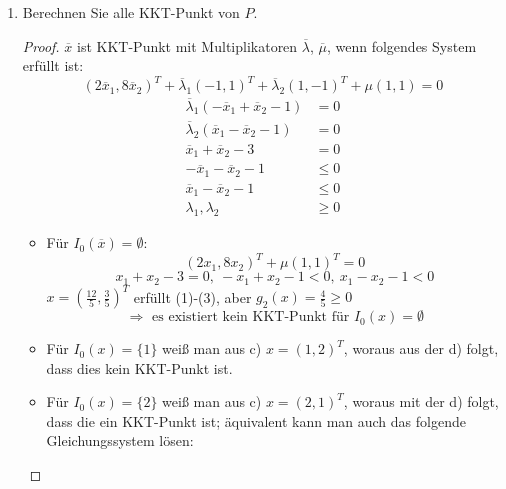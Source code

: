 \documentclass[12pt]{extreport} %
\theoremstyle{named}
\theoremstyle{nnamed}
\theoremstyle{itshape}
\theoremstyle{normal}
\begin{document}
\begin{enumerate}
\begin{proof}
\begin{figure*}[h!]
		\end{figure*}
		$$ \textit{ Zeichnung im Block } $$
		Es ist weiter
		$$ \Rightarrow - \nabla f(x^1) = (-2 , -16)^T, ~ -\nabla f(x^2) = (-4, - 8) $$
		Da $-\nabla f(x^1)$ nicht in die Menge $\left\{ x^1 + K(x^1) \right\}$ ragt, so ist $x^1$ kein KKT Punkt und da $-\nabla f(x^2)$  in die Menge $\left\{ x^2 + K(x^2) \right\} $ ragt, so ist $x^2$ ein KKT Punkt.
		\end{proof}
	\item Berechnen Sie alle KKT-Punkt von $P$.
		\begin{proof}
			$\overline{x}$ ist KKT-Punkt mit Multiplikatoren $\overline{\lambda}$, $\overline{\mu}$, wenn folgendes System erfüllt ist:
			 $$	\left( 2 \overline{x}_1, 8 \overline{x}_2 \right)^T + \overline{\lambda}_1 \left( -1, 1 \right)^T  + \overline{\lambda}_2 \left( 1, -1 \right)^T + \mu \left(1, 1 \right)  = 0 $$
			\begin{align*}
				\overline{\lambda}_1 \left( - \overline{x}_1 + \overline{x}_2 - 1 \right) & = 0 \\
				\overline{\lambda}_2 \left( \overline{x}_1 - \overline{x}_2 - 1 \right) & = 0 \\
				\overline{x}_1 + \overline{x}_2 - 3 & = 0 \\
				- \overline{x}_1 - \overline{x}_2 - 1& \leq 0 \\
				\overline{x}_1 - \overline{x}_2 - 1 & \leq 0 \\
				\lambda_1, \lambda_2 & \geq 0
			\end{align*}
			\begin{itemize}
				\item Für $I_0(\overline{x}) = \emptyset$:
					$$ \left( 2 x_1, 8 x_2 \right)^T + \mu \left( 1, 1 \right)^T = 0 $$
					$$ x_1 + x_2 - 3 = 0, ~ - x_1 + x_2 - 1 < 0, ~ x_1 - x_2 - 1 < 0 $$
					$x = \left(\frac{12}{5}, \frac{3}{5} \right)^T $ erfüllt (1)-(3), aber $g_2(x) = \frac{4}{5} \geq 0$ 
					$$\Rightarrow \text{ es existiert kein KKT-Punkt für } I_0(x) =\emptyset$$
				\item Für $I_0(x) = \{ 1 \}$ weiß man aus c) $x = (1, 2)^T$, woraus aus der d) folgt, dass dies kein KKT-Punkt ist.
				\item Für $I_0(x) = \{ 2 \}$ weiß man aus c) $x = (2, 1)^T$, woraus mit der d) folgt, dass die ein KKT-Punkt ist; äquivalent kann man auch das folgende Gleichungssystem lösen:

\end{itemize}
\end{proof}
\end{enumerate}
\end{document}
